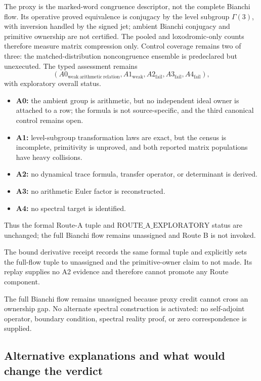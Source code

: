 \documentclass[11pt,a4paper]{article}
\theoremstyle{definition}
\theoremstyle{remark}
\begin{document}
The proxy is the marked-word congruence descriptor, not the complete Bianchi flow. Its operative proved equivalence is conjugacy by the level subgroup \(\Gamma(3)\), with inversion handled by the signed jet; ambient Bianchi conjugacy and primitive ownership are not certified. The pooled and loxodromic-only counts therefore measure matrix compression only. Control coverage remains two of three: the matched-distribution noncongruence ensemble is predeclared but unexecuted. The typed assessment remains
\[
 (A0_{\mathrm{weak\ arithmetic\ relation}},
 A1_{\mathrm{weak}},A2_{\mathrm{fail}},A3_{\mathrm{fail}},A4_{\mathrm{fail}}),
\]
with exploratory overall status.
\begin{itemize}
 \item \textbf{A0:} the ambient group is arithmetic, but no independent ideal owner is attached to a row; the formula is not source-specific, and the third canonical control remains open.
 \item \textbf{A1:} level-subgroup transformation laws are exact, but the census is incomplete, primitivity is unproved, and both reported matrix populations have heavy collisions.
 \item \textbf{A2:} no dynamical trace formula, transfer operator, or determinant is derived.
 \item \textbf{A3:} no arithmetic Euler factor is reconstructed.
 \item \textbf{A4:} no spectral target is identified.
\end{itemize}
Thus the formal Route-A tuple and \(\mathrm{ROUTE\_A\_EXPLORATORY}\) status are unchanged; the full Bianchi flow remains unassigned and Route B is not invoked.

The bound derivative receipt records the same formal tuple and explicitly sets the full-flow tuple to unassigned and the primitive-owner claim to not made. Its replay supplies no A2 evidence and therefore cannot promote any Route component.

The full Bianchi flow remains unassigned because proxy credit cannot cross an ownership gap. No alternate spectral construction is activated: no self-adjoint operator, boundary condition, spectral reality proof, or zero correspondence is supplied.

\subsection{Alternative explanations and what would change the verdict}
\end{document}
